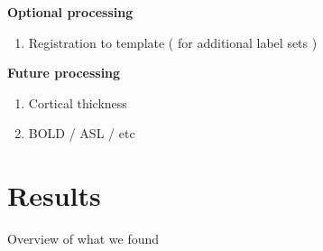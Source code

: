 \documentclass{frontiersSCNS} %
\begin{document}
\textbf{Optional processing}
\begin{enumerate}
\item Registration to template ( for additional label sets )
\end{enumerate}

\textbf{Future processing}
\begin{enumerate}
\item Cortical thickness
\item BOLD / ASL / etc
\end{enumerate}



\section{Results}
Overview of what we found




\end{document}

